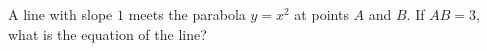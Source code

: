 A line with slope $1$ meets the parabola $y=x^2$ at points $A$ and $B$. If $AB=3$, what is the equation of the line?
